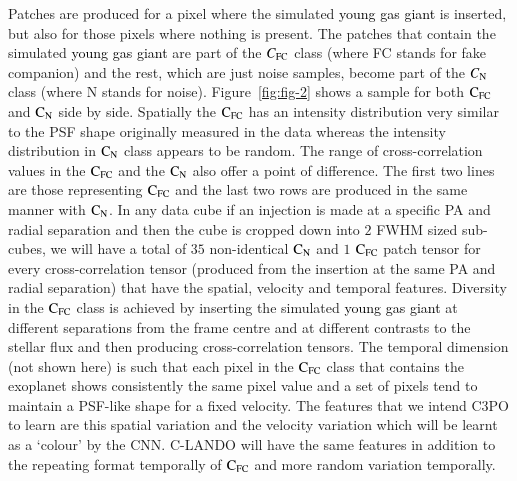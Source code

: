 \documentclass{aa}
\newcommand{\newchange}[1]{\textcolor{black}{#1}}
\begin{document}
Patches are produced for a pixel where the simulated \newchange{young gas giant} is inserted, but also for those pixels where nothing is present.
The patches that contain the simulated \newchange{young gas giant} are part of the $C_{\rm{FC}}$ class (where FC stands for fake companion) and the rest, which are just noise samples, become part of the $C_{\rm{N}}$ class (where N stands for noise).
Figure~\ref{fig:fig-2} shows a sample for both $\rm{C_{FC}}$ and $\rm{C_N}$ side by side.
Spatially the $\rm{C_{FC}}$ has an intensity distribution very similar to the PSF shape originally measured in the data whereas the intensity distribution in $\rm{C_N}$ class appears to be random.
The range of cross-correlation values in the $\rm{C_{FC}}$ and the $\rm{C_N}$ also offer a point of difference.
The first two lines are those representing $\rm{C_{FC}}$ and the last two rows are produced in the same manner with $\rm{C_N}$.
In any data cube if an injection is made at a specific PA and radial separation and then the cube is cropped down into $2$ FWHM sized sub-cubes, we will have a total of $35$ non-identical $\rm{C_N}$ and $1$ $\rm{C_{FC}}$ patch tensor for every cross-correlation tensor (produced from the insertion at the same PA and radial separation) that have the spatial, velocity and temporal features. 
Diversity in the $\rm{C_{FC}}$ class is achieved by inserting the simulated \newchange{young gas giant} at different separations from the frame centre and at different contrasts to the stellar flux and then producing cross-correlation tensors.
The temporal dimension (not shown here) is such that each pixel in the $\rm{C_{FC}}$ class that contains the exoplanet shows consistently the same pixel value and a set of pixels tend to maintain a PSF-like shape for a fixed velocity. 
The features that we intend C3PO to learn are this spatial variation and the velocity variation which will be learnt as a `colour' by the CNN. 
C-LANDO will have the same features in addition to the repeating format temporally of $\rm{C_{FC}}$ and more random variation temporally.
\end{document}
